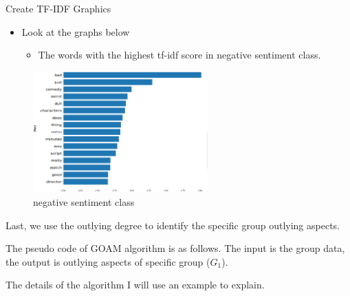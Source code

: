 \documentclass[
 size=14pt,
 paper=smartboard,  %
 mode=present, 		%
 display=slides, 	%
 style=tuliplab,  	%
 pauseslide,
 fleqn,leqno]{powerdot}
\begin{document}
\begin{slide}{Create TF-IDF Graphics}
  \begin{itemize}
    \item
    Look at the graphs below 
    \begin{itemize}
      \item
      The words with the highest tf-idf score in negative sentiment class.
      
     
      \end{itemize}
    \end{itemize}
    
    \begin{figure}
      \centering
      \includegraphics[width=0.6\textwidth,natwidth=866,natheight=600]{figures/ns.eps}
      \caption{negative sentiment class}\label{Checking for outliers}
    \end{figure}
    
    \begin{note}
    Last,
    we use the outlying degree to identify the specific group outlying aspects.
    
    The pseudo code of GOAM algorithm is as follows.
    The input is the group data,
    the output is outlying aspects of specific group ($G_1$).
    
    The details of the algorithm I will use an example to explain.
    \end{note}

\end{slide}
\end{document}
